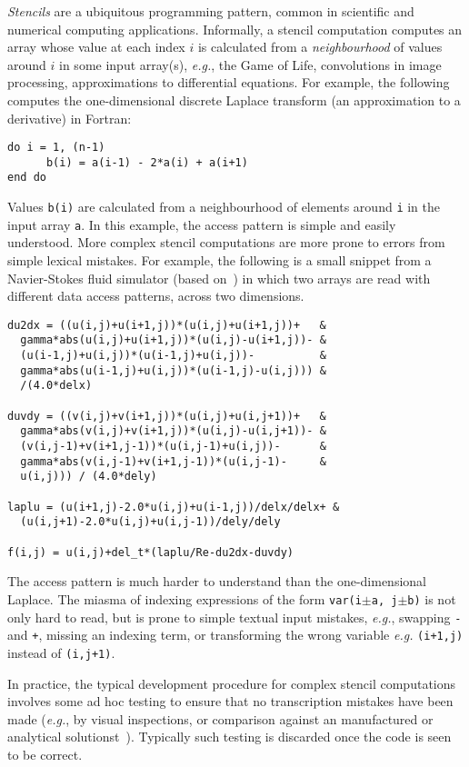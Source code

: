 \documentclass[10pt,preprint,numbers]{sigplanconf}
\theoremstyle{definition}
\newcommand{\eg}{\emph{e.g.}}
\begin{document}
\emph{Stencils} are a ubiquitous programming pattern, common in
scientific and numerical computing applications. Informally, a stencil
computation computes an array whose value at each index $i$ is
calculated from a \emph{neighbourhood} of values around $i$ in some
input array(s), \eg{}, the Game of Life, convolutions in image
processing, approximations to differential equations. For example, the
following computes the one-dimensional discrete Laplace transform (an
approximation to a derivative) in Fortran:
%
\begin{verbatim}
do i = 1, (n-1)
      b(i) = a(i-1) - 2*a(i) + a(i+1)
end do
\end{verbatim}
%
Values \texttt{b(i)} are calculated from a neighbourhood of elements
around \texttt{i} in the input array \texttt{a}.  In this example, the
access pattern is simple and easily understood. More complex
stencil computations are more prone to errors from simple lexical
mistakes. For example, the following is a small snippet from a
Navier-Stokes fluid simulator (based on~\citet{griebel1997numerical})
 in which two arrays are read with
different data access patterns, across two dimensions.
\begin{verbatim}
du2dx = ((u(i,j)+u(i+1,j))*(u(i,j)+u(i+1,j))+   &
  gamma*abs(u(i,j)+u(i+1,j))*(u(i,j)-u(i+1,j))- &
  (u(i-1,j)+u(i,j))*(u(i-1,j)+u(i,j))-          &
  gamma*abs(u(i-1,j)+u(i,j))*(u(i-1,j)-u(i,j))) &
  /(4.0*delx)

duvdy = ((v(i,j)+v(i+1,j))*(u(i,j)+u(i,j+1))+   &
  gamma*abs(v(i,j)+v(i+1,j))*(u(i,j)-u(i,j+1))- &
  (v(i,j-1)+v(i+1,j-1))*(u(i,j-1)+u(i,j))-      &
  gamma*abs(v(i,j-1)+v(i+1,j-1))*(u(i,j-1)-     &
  u(i,j))) / (4.0*dely)

laplu = (u(i+1,j)-2.0*u(i,j)+u(i-1,j))/delx/delx+ &
  (u(i,j+1)-2.0*u(i,j)+u(i,j-1))/dely/dely

f(i,j) = u(i,j)+del_t*(laplu/Re-du2dx-duvdy)
\end{verbatim}
The access pattern is much harder to understand than the
one-dimensional Laplace.  The miasma of indexing expressions of the
form \texttt{var(i$\pm$a, j$\pm$b)} is not only hard to read, but is
prone to simple textual input mistakes, \eg{}, swapping \texttt{-} and
\texttt{+}, missing an indexing term, or transforming the wrong
variable \eg{} \texttt{(i+1,j)} instead of \texttt{(i,j+1)}.

In practice, the typical development procedure for complex
stencil computations involves some ad hoc testing to ensure that no
transcription mistakes have been made (\eg{}, by visual
inspections, or comparison against an manufactured or 
analytical solutionst~\cite{farrell2010automated}). Typically such
testing is discarded once the code is seen to be correct.
\end{document}
